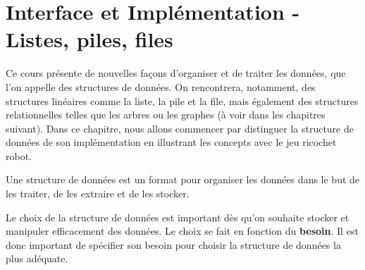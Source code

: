 \chapter{Interface et Implémentation - Listes, piles, files}
Ce cours présente de nouvelles façons d'organiser et de traiter les données, que l'on appelle des structures de données. On rencontrera, notamment, des structures linéaires comme la liste, la pile et la file, mais également des structures relationnelles telles que les arbres ou les graphes (à voir dans les chapitres suivant). Dans ce chapitre, nous allons commencer par distinguer la structure de données de son implémentation en illustrant les concepts avec le jeu ricochet robot.\\

\begin{tcolorbox}[enhanced,
    colback=green!25!black!10!white,colframe=green!75!black,title=Structure de données,
    drop fuzzy shadow,watermark color=white]
    Une structure de données est un format pour organiser les données dans le but de les traiter, de les extraire et de les stocker. 
  \end{tcolorbox}


Le choix de la structure de données est important dès qu'on souhaite stocker et manipuler efficacement des données. Le choix se fait en fonction du \textbf{besoin}. Il est donc important de spécifier son besoin pour choisir la structure de données la plus adéquate.\\

